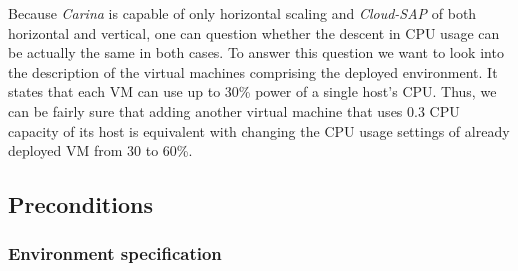 Because \emph{Carina} is capable of only horizontal scaling and \emph{Cloud-SAP} of both horizontal and vertical, one can question whether the descent in CPU usage can be actually the same in both cases. To answer this question we want to look into the description of the virtual machines comprising the deployed environment. It states that each VM can use up to 30\% power of a single host's CPU. Thus, we can be fairly sure that adding another virtual machine that uses 0.3 CPU capacity of its host is equivalent with changing the CPU usage settings of already deployed VM from 30 to 60\%.
\subsection*{Preconditions}
\subsubsection*{Environment specification}

